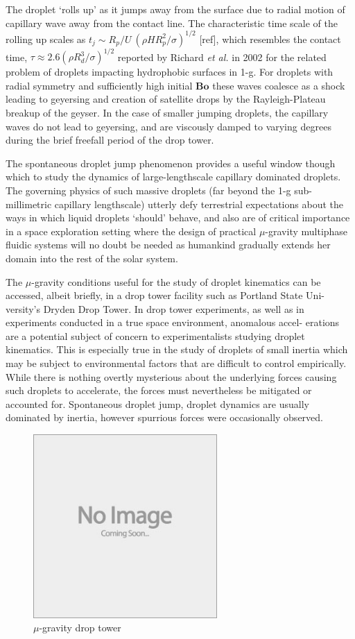 \documentclass{jfm}
\begin{document}
The droplet `rolls up' as it jumps away from the surface due to radial motion of capillary wave away from the contact line. The characteristic time scale of the rolling up scales as $t_j \sim R_p/U ~(\rho H R^2_p/\sigma)^{1/2}$ [ref], which resembles the contact time, $\tau \approx 2.6(\rho R^3_d/\sigma)^{1/2}$ reported by Richard \emph{et al.} in 2002 for the related problem of droplets impacting hydrophobic surfaces in 1-g. For droplets with radial symmetry and sufficiently high initial $\mathbf{Bo}$ these waves coalesce as a shock leading to geyersing and creation of satellite drops by the Rayleigh-Plateau breakup of the geyser. In the case of smaller jumping droplets, the capillary waves do not lead to geyersing, and are viscously damped to varying degrees during the brief freefall period of the drop tower.

The spontaneous droplet jump phenomenon provides a useful window though which to study the dynamics of large-lengthscale capillary dominated droplets. The governing physics of such massive droplets (far beyond the 1-g sub-millimetric capillary lengthscale) utterly defy terrestrial expectations about the ways in which liquid droplets `should' behave, and also are of critical importance in a space exploration setting where the design of practical $\mu$-gravity  multiphase fluidic systems will no doubt be needed as humankind gradually extends her domain into the rest of the solar system. 

The $\mu$-gravity conditions useful for the study of droplet kinematics can be
accessed, albeit briefly, in a drop tower facility such as Portland State Uni-
versity’s Dryden Drop Tower. In drop tower experiments, as well as in
experiments conducted in a true space environment, anomalous accel-
erations are a potential subject of concern to experimentalists studying
droplet kinematics. This is especially true in the study of droplets of small
inertia which may be subject to environmental factors that are difficult to control empirically. While there is nothing overtly mysterious about
the underlying forces causing such droplets to accelerate, the forces must
nevertheless be mitigated or accounted for. Spontaneous droplet jump, droplet dynamics are usually dominated by inertia, however spurrious forces were occasionally observed. 


\begin{figure}
  \centerline{\includegraphics[height=7cm,width=7cm]{e88_1_thumb.jpg}}
  \caption{$\mu$-gravity drop tower}
\label{fig:ddt}
\end{figure}
\end{document}
